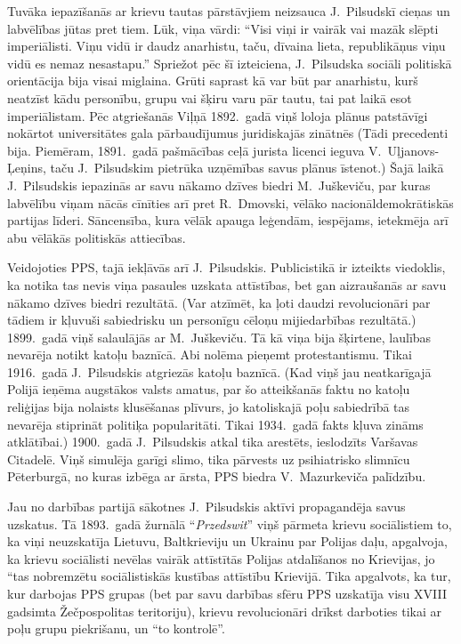 \documentclass[twoside,a5paper,12pt,fleqn,openany]{extbook}
\newcommand{\pltxti}[1]{\textit{\textpolish{#1}}}
\begin{document}
Tuvāka iepazīšanās ar krievu tautas pārstāvjiem neizsauca J.~Pilsudskī cieņas un labvēlības jūtas pret tiem. Lūk, viņa vārdi: ``Visi viņi ir vairāk vai mazāk slēpti imperiālisti. Viņu vidū ir daudz anarhistu, taču, dīvaina lieta, republikāņus viņu vidū es nemaz nesastapu.'' Spriežot pēc šī izteiciena, J.~Pilsudska sociāli politiskā orientācija bija visai miglaina. Grūti saprast kā var būt par anarhistu, kurš neatzīst kādu personību, grupu vai šķiru varu pār tautu, tai pat laikā esot imperiālistam. Pēc atgriešanās Viļņā 1892.~gadā viņš loloja plānus patstāvīgi nokārtot universitātes gala pārbaudījumus juridiskajās zinātnēs (Tādi precedenti bija. Piemēram, 1891.~gadā pašmācības ceļā jurista licenci ieguva V.~Uļjanovs-Ļeņins, taču J.~Pilsudskim pietrūka uzņēmības savus plānus īstenot.) Šajā laikā J.~Pilsudskis iepazinās ar savu nākamo dzīves biedri M.~Juškeviču, par kuras labvēlību viņam nācās cīnīties arī pret R.~Dmovski, vēlāko nacionāldemokrātiskās partijas līderi. Sāncensība, kura vēlāk apauga leģendām, iespējams, ietekmēja arī abu vēlākās politiskās attiecības.

Veidojoties PPS, tajā iekļāvās arī J.~Pilsudskis. Publicistikā ir izteikts viedoklis, ka notika tas nevis viņa pasaules uzskata attīstības, bet gan aizraušanās ar savu nākamo dzīves biedri rezultātā. (Var atzīmēt, ka ļoti daudzi revolucionāri par tādiem ir kļuvuši sabiedrisku un personīgu cēloņu mijiedarbības rezultātā.) 1899.~gadā viņš salaulājās ar M.~Juškeviču. Tā kā viņa bija šķirtene, laulības nevarēja notikt katoļu baznīcā. Abi nolēma pieņemt protestantismu. Tikai 1916.~gadā J.~Pilsudskis atgriezās katoļu baznīcā. (Kad viņš jau neatkarīgajā Polijā ieņēma augstākos valsts amatus, par šo atteikšanās faktu no katoļu reliģijas bija nolaists klusēšanas plīvurs, jo katoliskajā poļu sabiedrībā tas nevarēja stiprināt politiķa popularitāti. Tikai 1934.~gadā fakts kļuva zināms atklātībai.) 1900.~gadā J.~Pilsudskis atkal tika arestēts, ieslodzīts Varšavas Citadelē. Viņš simulēja garīgi slimo, tika pārvests uz psihiatrisko slimnīcu Pēterburgā, no kuras izbēga ar ārsta, PPS biedra V.~Mazurkeviča palīdzību.

Jau no darbības partijā sākotnes J.~Pilsudskis aktīvi propagandēja savus uzskatus. Tā 1893.~gadā žurnālā ``\pltxti{Przedswit}'' viņš pārmeta krievu sociālistiem to, ka viņi neuzskatīja Lietuvu, Baltkrieviju un Ukrainu par Polijas daļu, apgalvoja, ka krievu sociālisti nevēlas vairāk attīstītās Polijas atdalīšanos no Krievijas, jo ``tas nobremzētu sociālistiskās kustības attīstību Krievijā. Tika apgalvots, ka tur, kur darbojas PPS grupas (bet par savu darbības sfēru PPS uzskatīja visu XVIII gadsimta Žečpospolitas teritoriju), krievu revolucionāri drīkst darboties tikai ar poļu grupu piekrišanu, un ``to kontrolē''.
\end{document}
